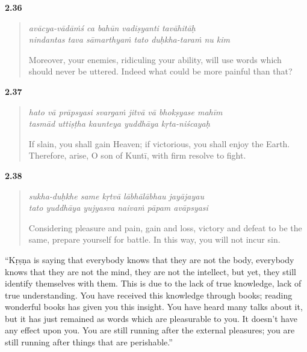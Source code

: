 \par\noindent\textbf{2.36}\par
\begin{verse}
\textit{avācya-vādāṁś ca bahūn vadiṣyanti tavāhitāḥ} \\
\textit{nindantas tava sāmarthyaṁ tato duḥkha-taraṁ nu kim}

\noindent Moreover, your enemies, ridiculing your ability, will use words which should never be uttered. Indeed what could be more painful than that?
\end{verse}
\par



\par\noindent\textbf{2.37}\par
\begin{verse}
\textit{hato vā prāpsyasi svargaṁ jitvā vā bhokṣyase mahīm} \\
\textit{tasmād uttiṣṭha kaunteya yuddhāya kṛta-niścayaḥ}

\noindent If slain, you shall gain Heaven; if victorious, you shall enjoy the Earth. Therefore, arise, O son of Kuntī, with firm resolve to fight.
\end{verse}
\par



\par\noindent\textbf{2.38}\par
\begin{verse}
\textit{sukha-duḥkhe same kṛtvā lābhālābhau jayājayau} \\
\textit{tato yuddhāya yujyasva naivaṁ pāpam avāpsyasi}

\noindent Considering pleasure and pain, gain and loss, victory and defeat to be the same, prepare yourself for battle. In this way, you will not incur sin.
\end{verse}
\par


\enquote{Kṛṣṇa is saying that everybody knows that they are not the body, everybody knows that they are not the mind, they are not the intellect, but yet, they still identify themselves with them. This is due to the lack of true knowledge, lack of true understanding. You have received this knowledge through books; reading wonderful books has given you this insight. You have heard many talks about it, but it has just remained as words which are pleasurable to you. It doesn’t have any effect upon you. You are still running after the external pleasures; you are still running after things that are perishable.}


